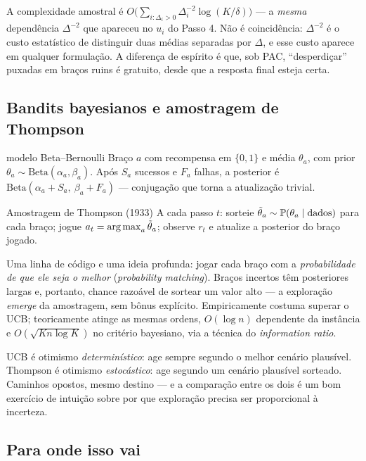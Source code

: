 \documentclass[11pt]{article}
\begin{document}
A complexidade amostral é
$O\bigl(\sum_{i:\Delta_i>0}\Delta_i^{-2}\log(K/\delta)\bigr)$ --- a
\emph{mesma} dependência $\Delta^{-2}$ que apareceu no $u_i$ do Passo 4. Não é
coincidência: $\Delta^{-2}$ é o custo estatístico de distinguir duas médias
separadas por $\Delta$, e esse custo aparece em qualquer formulação. A
diferença de espírito é que, sob PAC, ``desperdiçar'' puxadas em braços ruins
é gratuito, desde que a resposta final esteja certa.

\subsection*{Bandits bayesianos e amostragem de Thompson}

\begin{defbox}{modelo Beta--Bernoulli}
Braço $a$ com recompensa em $\{0,1\}$ e média $\theta_a$, com prior
$\theta_a \sim \mathrm{Beta}(\alpha_a,\beta_a)$. Após $S_a$ sucessos e $F_a$
falhas, a posterior é $\mathrm{Beta}(\alpha_a+S_a,\ \beta_a+F_a)$ ---
conjugação que torna a atualização trivial.
\end{defbox}

\begin{algbox}{Amostragem de Thompson (1933)}
A cada passo $t$: sorteie $\tilde\theta_a \sim \mathbb{P}(\theta_a \mid \text{dados})$
para cada braço; jogue $a_t = \operatorname*{arg\,max}_a \tilde\theta_a$; observe $r_t$ e
atualize a posterior do braço jogado.
\end{algbox}

Uma linha de código e uma ideia profunda: jogar cada braço com a
\emph{probabilidade de que ele seja o melhor} (\emph{probability matching}).
Braços incertos têm posteriores largas e, portanto, chance razoável de sortear
um valor alto --- a exploração \emph{emerge} da amostragem, sem bônus
explícito. Empiricamente costuma superar o UCB; teoricamente atinge as mesmas
ordens, $O(\log n)$ dependente da instância e $O(\sqrt{Kn\log K})$ no critério
bayesiano, via a técnica do \emph{information ratio}.

\begin{ideiabox}
UCB é otimismo \emph{determinístico}: age sempre segundo o melhor cenário
plausível. Thompson é otimismo \emph{estocástico}: age segundo um cenário
plausível sorteado. Caminhos opostos, mesmo destino --- e a comparação entre os
dois é um bom exercício de intuição sobre por que exploração precisa ser
proporcional à incerteza.
\end{ideiabox}

\subsection*{Para onde isso vai}
\end{document}
